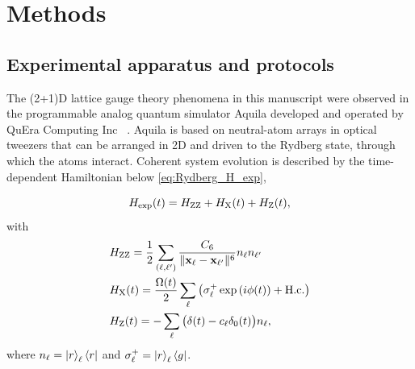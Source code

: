 \documentclass[footinbib,a4paper,aps,superscriptaddress,twocolumn,preprintnumbers,amsmath,amssymb,nobalancelastpage,10pt,prl]{revtex4-2}
\begin{document}



%
\setcounter{figure}{0}

\renewcommand{\figurename}{\textbf{Extended Data Fig.}}
\renewcommand{\theHfigure}{Extended Data\thefigure}

\section*{Methods}

\subsection*{Experimental apparatus and protocols}

The (2+1)D lattice gauge theory phenomena in this manuscript were observed in the programmable analog quantum simulator Aquila developed and operated by QuEra Computing Inc ~\cite{Wurtz_2023}. Aquila is based on neutral-atom arrays in optical tweezers that can be arranged in 2D and driven to the Rydberg state, through which the atoms interact. Coherent system evolution is described by the time-dependent Hamiltonian below \eqref{eq:Rydberg_H_exp},

\begin{equation}
\label{eq:Rydberg_H_exp}
H_{\rm exp}(t) = H_{\rm ZZ} + H_{\rm X}(t) + H_{\rm Z}(t),
\end{equation}
with
\begin{equation}
\begin{aligned}
& H_{\rm ZZ} = \frac{1}{2}\sum_{(\ell, \ell^\prime)} \frac{C_6}{\|{\bf x}_\ell - {\bf x}_{\ell^\prime}\|^6} n_\ell n_{\ell^\prime} \\
& H_{\rm X}(t) = \frac{\Omega(t)}{2}\sum_\ell\big(\sigma_\ell^+\exp{(i\phi(t))} + {\rm H.c.} \big) \\
& H_{\rm Z}(t) = - \sum_\ell \big(\delta(t) - c_\ell\delta_0(t)\big) n_\ell,
\end{aligned}
\end{equation}
where $n_\ell = \ket{r}_\ell\bra{r}$ and $\sigma_\ell^+ = \ket{r}_\ell\bra{g}$.
\end{document}
